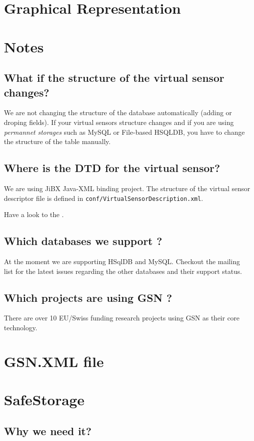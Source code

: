 \section{Graphical Representation}

\section{Notes}

\subsection{What if the structure of the virtual sensor changes?}
We are not changing the structure of the database automatically (adding or droping fields). If your virtual sensors structure
changes and if you are using \emph{permannet storages} such as MySQL or File-based HSQLDB, you have to change the structure of the
table manually.

\subsection{Where is the DTD for the virtual sensor?}
We are using JiBX Java-XML binding project. The structure of the virtual sensor descriptor file is defined in \texttt{conf/VirtualSensorDescription.xml}.

Have a look to the .

\subsection{Which databases we support ?}
At the moment we are supporting HSqlDB and MySQL. Checkout the mailing list for the latest issues regarding the other databases and their
support status.
\subsection{Which projects are using GSN ?}
There are over 10 EU/Swiss funding research projects using GSN as their core technology.
\section{GSN.XML file}
\section{SafeStorage}
\subsection{Why we need it? }
